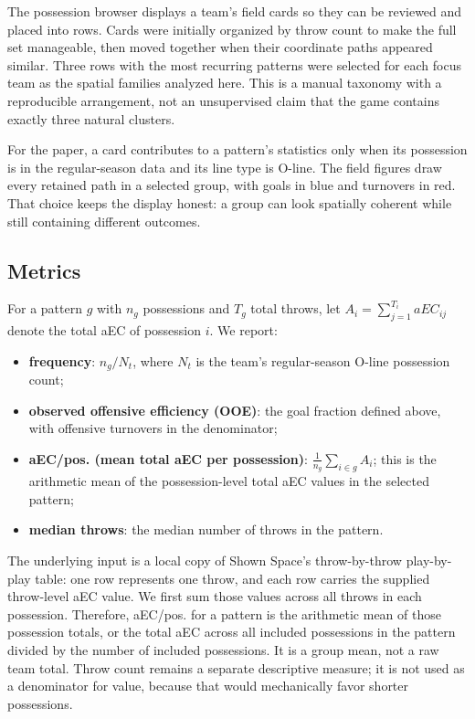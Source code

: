 \documentclass[11pt]{article}
\newcommand{\aEC}{aEC}
\newcommand{\Oline}{O-line}
\begin{document}
The possession browser displays a team's field cards so they can be reviewed and
placed into rows. Cards were initially organized by throw count to make the full
set manageable, then moved together when their coordinate paths appeared similar.
Three rows with the most recurring patterns were selected for each focus team as
the spatial families analyzed here. This is a manual taxonomy with a reproducible
arrangement, not an unsupervised claim that the game contains exactly three
natural clusters.

For the paper, a card contributes to a pattern's statistics only when its
possession is in the regular-season data and its line type is \Oline{}. The field
figures draw every retained path in a selected group, with goals in blue and
turnovers in red. That choice keeps the display honest: a group can look
spatially coherent while still containing different outcomes.

\subsection{Metrics}

For a pattern $g$ with $n_g$ possessions and $T_g$ total throws, let
$A_i = \sum_{j=1}^{T_i} aEC_{ij}$ denote the total aEC of possession $i$.
We report:

\begin{itemize}
  \item \textbf{frequency}: $n_g/N_t$, where $N_t$ is the team's regular-season
        \Oline{} possession count;
  \item \textbf{observed offensive efficiency (OOE)}: the goal fraction defined
        above, with offensive turnovers in the denominator;
  \item \textbf{aEC/pos. (mean total \aEC{} per possession)}:
        $\frac{1}{n_g}\sum_{i \in g} A_i$;
        this is the arithmetic mean of the possession-level total aEC values in
        the selected pattern;
  \item \textbf{median throws}: the median number of throws in the pattern.
\end{itemize}

The underlying input is a local copy of Shown Space's throw-by-throw play-by-play
table: one row represents one throw, and each row carries the supplied throw-level
\aEC{} value. We first sum those values across all throws in each possession.
Therefore, aEC/pos. for a pattern is the arithmetic mean of those possession
totals, or the total \aEC{} across all included possessions in the pattern divided
by the number of included possessions. It is a group mean, not a raw team total.
Throw count remains a separate descriptive measure; it is not used as a denominator
for value, because that would mechanically favor shorter possessions.
\end{document}
